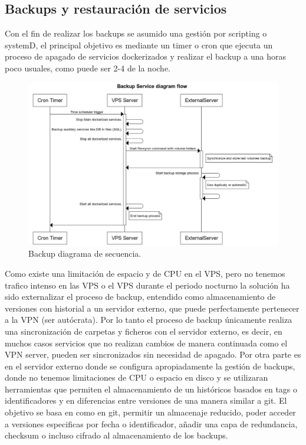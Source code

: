 \subsection{Backups y restauración de servicios}
Con el fin de realizar los backups se asumido una gestión por scripting o systemD, el principal objetivo es mediante un timer o cron que ejecuta un proceso de apagado de servicios dockerizados y realizar el backup a una horas poco usuales, como puede ser 2-4 de la noche.
\begin{figure}[!htb]
\begin{center}
\includegraphics[width=1\textwidth]{./figuras/backup_diagram}
\caption{Backup diagrama de secuencia.}
\label{F:backup_diagram}
\end{center}
\end{figure}
Como existe una limitación de espacio y de CPU en el VPS, pero no tenemos trafico intenso en las VPS o el VPS durante el periodo nocturno la solución ha sido externalizar el proceso de backup, entendido como almacenamiento de versiones con historial a un servidor externo, que puede perfectamente pertenecer a la VPN (ser autócrata).
Por lo tanto el proceso de backup únicamente realiza una sincronización de carpetas y ficheros con el servidor externo, es decir, en muchos casos servicios que no realizan cambios de manera continuada como el VPN server, pueden ser sincronizados sin necesidad de apagado. Por otra parte es en el servidor externo donde se configura apropiadamente la gestión de backups, donde no tenemos limitaciones de CPU o espacio en disco y se utilizaran herramientas que permiten el almacenamiento de un históricos basados en tags o identificadores y en diferencias entre versiones de una manera similar a git. El objetivo se basa en como en git, permitir un almacenaje reducido, poder acceder a versiones especificas por fecha o identificador, añadir una capa de redundancia, checksum o incluso cifrado al almacenamiento de los backups.
